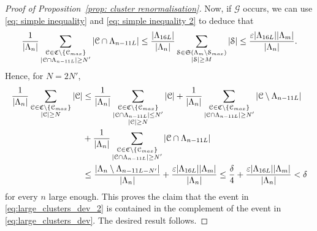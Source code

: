 \documentclass[11pt,a4paper]{article}
\theoremstyle{definition}
\numberwithin{equation}{section}
\begin{document}
\begin{proof}[Proof of Proposition~\textup{\ref{prop: cluster renormalisation}}]
Now, if $\mathcal{G}$ occurs, we can use \eqref{eq: simple inequality} and \eqref{eq: simple inequality 2} to deduce that 
\begin{equation}
\frac{1}{|\Lambda_n|}\sum_{
\substack{\mathcal{C}\in \mathfrak{C}\setminus\{\mathcal{C}_{\rm max}\}\\ |\mathcal{C}\cap \Lambda_{n-11L}|\geq N'}}|\mathcal{C}\cap \Lambda_{n-11L}|\leq \frac{|\Lambda_{16L}|}{|\Lambda_n|}\sum_{
\substack{\mathcal{S}\in \mathfrak{S}(\Lambda_m\setminus \mathcal{S}_{\rm max})\\ |\mathcal{S}|\geq M}} |\mathcal{S}|\leq \frac{\varepsilon |\Lambda_{16L}| |\Lambda_m|}{|\Lambda_n|}.    
\end{equation}
Hence, for $N=2N'$,
\begin{equation}
\begin{aligned}
\frac{1}{|\Lambda_n|} \sum_{
\substack{\mathcal{C}\in \mathfrak{C}\setminus\{\mathcal{C}_{\rm max}\}\\ |\mathcal{C}|\geq N}} |\mathcal{C}| &\leq \frac{1}{|\Lambda_n|} \sum_{
\substack{\mathcal{C}\in \mathfrak{C}\setminus\{\mathcal{C}_{\rm max}\}\\ |\mathcal{C}\cap \Lambda_{n-11L}|\leq N'\\ |\mathcal{C}|\geq N}} |\mathcal{C}|+\frac{1}{|\Lambda_n|} \sum_{
\substack{\mathcal{C}\in \mathfrak{C}\setminus\{\mathcal{C}_{\rm max}\}\\ |\mathcal{C}\cap \Lambda_{n-11L}|\geq N'}} |\mathcal{C}\setminus \Lambda_{n-11L}|\\
&+\frac{1}{|\Lambda_n|} \sum_{
\substack{\mathcal{C}\in \mathfrak{C}\setminus\{\mathcal{C}_{\rm max}\}\\ |\mathcal{C}\cap \Lambda_{n-11L}|\geq N'}} |\mathcal{C}\cap \Lambda_{n-11L}|\\
&\leq \frac{|\Lambda_n\setminus \Lambda_{n-11L-N'}|}{|\Lambda_n|}+\frac{\varepsilon |\Lambda_{16L}| |\Lambda_m|}{|\Lambda_n|}
\leq \frac{\delta}{4}+\frac{\varepsilon |\Lambda_{16L}| |\Lambda_m|}{|\Lambda_n|}<\delta
\end{aligned}
\end{equation}
for every $n$ large enough. This proves the claim that the event in \eqref{eq:large_clusters_dev_2} is contained in the complement of the event in \eqref{eq:large_clusters_dev}. The desired result follows.
\end{proof}
\end{document}
